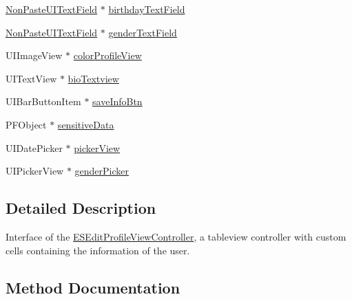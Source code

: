 \begin{DoxyCompactItemize}
\hyperlink{interface_non_paste_u_i_text_field}{Non\+Paste\+U\+I\+Text\+Field} $\ast$ \hyperlink{interface_e_s_edit_profile_view_controller_a6d4ac47ac928b5675fe6532c139e7778}{birthday\+Text\+Field}
\item 
\hyperlink{interface_non_paste_u_i_text_field}{Non\+Paste\+U\+I\+Text\+Field} $\ast$ \hyperlink{interface_e_s_edit_profile_view_controller_a05b914950b0d2a24ba35969e928e0360}{gender\+Text\+Field}
\item 
U\+I\+Image\+View $\ast$ \hyperlink{interface_e_s_edit_profile_view_controller_a8f938b0e95d8fa36867f783fb2191a2f}{color\+Profile\+View}
\item 
U\+I\+Text\+View $\ast$ \hyperlink{interface_e_s_edit_profile_view_controller_aab037f90001248fedf0052e42d660726}{bio\+Textview}
\item 
U\+I\+Bar\+Button\+Item $\ast$ \hyperlink{interface_e_s_edit_profile_view_controller_a997b75bc61f0cf058852c2fcc676182b}{save\+Info\+Btn}
\item 
P\+F\+Object $\ast$ \hyperlink{interface_e_s_edit_profile_view_controller_a53c8bf2dc1137d68e9c7737363bc29f5}{sensitive\+Data}
\item 
U\+I\+Date\+Picker $\ast$ \hyperlink{interface_e_s_edit_profile_view_controller_a6a86d1bff921b0bf6629907cada17808}{picker\+View}
\item 
U\+I\+Picker\+View $\ast$ \hyperlink{interface_e_s_edit_profile_view_controller_a8bd2fcffae0d056383f32f204826874e}{gender\+Picker}
\end{DoxyCompactItemize}


\subsection{Detailed Description}
Interface of the \hyperlink{interface_e_s_edit_profile_view_controller}{E\+S\+Edit\+Profile\+View\+Controller}, a tableview controller with custom cells containing the information of the user. 

\subsection{Method Documentation}
\hypertarget{interface_e_s_edit_profile_view_controller_a944cb142a54a3eb1be14beb031689cac}{}
